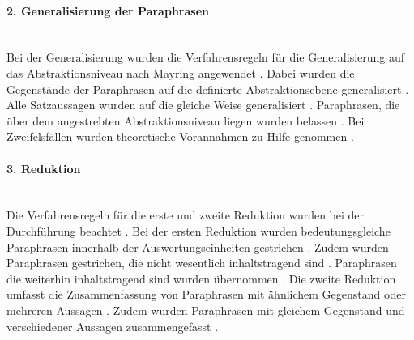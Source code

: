 \paragraph{2. Generalisierung der Paraphrasen}\mbox{} \\
Bei der Generalisierung wurden die Verfahrensregeln für die Generalisierung auf das Abstraktionsniveau nach Mayring angewendet \cite{mayring2019qualitative}. Dabei wurden die Gegenstände der Paraphrasen auf die definierte Abstraktionsebene generalisiert \cite{mayring2019qualitative}. Alle Satzaussagen wurden auf die gleiche Weise generalisiert \cite{mayring2019qualitative}. Paraphrasen, die über dem angestrebten Abstraktionsniveau liegen wurden belassen \cite{mayring2019qualitative}. Bei Zweifelsfällen wurden theoretische Vorannahmen zu Hilfe genommen \cite{mayring2019qualitative}.
\paragraph{3. Reduktion}\mbox{} \\
Die Verfahrensregeln für die erste und zweite Reduktion wurden bei der Durchführung beachtet \cite{mayring2019qualitative}. Bei der ersten Reduktion wurden bedeutungsgleiche Paraphrasen innerhalb der Auswertungseinheiten gestrichen \cite{mayring2019qualitative}. Zudem wurden Paraphrasen gestrichen, die nicht wesentlich inhaltstragend sind \cite{mayring2019qualitative}. Paraphrasen die weiterhin inhaltstragend sind wurden übernommen \cite{mayring2019qualitative}. Die zweite Reduktion umfasst die Zusammenfassung von Paraphrasen mit ähnlichem Gegenstand oder mehreren Aussagen \cite{mayring2019qualitative}. Zudem wurden Paraphrasen mit gleichem Gegenstand und verschiedener Aussagen zusammengefasst \cite{mayring2019qualitative}.
